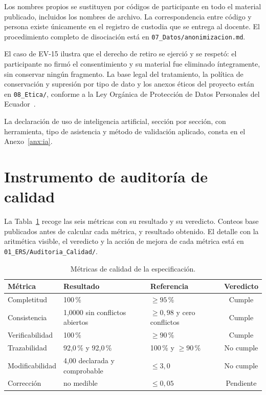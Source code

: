 \documentclass[11pt,a4paper]{article}
\begin{document}
Los nombres propios se sustituyen por c\'odigos de participante en todo el material
publicado, incluidos los nombres de archivo. La correspondencia entre c\'odigo y persona
existe \'unicamente en el registro de custodia que se entrega al docente. El
procedimiento completo de disociaci\'on est\'a en \texttt{07\_Datos/anonimizacion.md}.

El caso de EV-15 ilustra que el derecho de retiro se ejerci\'o y se respet\'o: el
participante no firm\'o el consentimiento y su material fue eliminado \'integramente, sin
conservar ning\'un fragmento. La base legal del tratamiento, la pol\'itica de
conservaci\'on y supresi\'on por tipo de dato y los anexos \'eticos del proyecto est\'an
en \texttt{08\_Etica/}, conforme a la Ley Org\'anica de Protecci\'on de Datos Personales
del Ecuador~\cite{asamblea2021lopdp}.

La declaraci\'on de uso de inteligencia artificial, secci\'on por secci\'on, con
herramienta, tipo de asistencia y m\'etodo de validaci\'on aplicado, consta en el
Anexo~\ref{anx:ia}.

\newpage

\nocite{*}


\newpage
\appendix

\section{Instrumento de auditor\'ia de calidad}
\label{anx:auditoria}

La Tabla~\ref{tab:metricas} recoge las seis m\'etricas con su resultado y su veredicto. Conteos base publicados antes de calcular cada m\'etrica, y resultado obtenido. El
detalle con la aritm\'etica visible, el veredicto y la acci\'on de mejora de cada
m\'etrica est\'a en \texttt{01\_ERS/Auditoria\_Calidad/}.

\begin{table}[H]\centering\small
\caption{M\'etricas de calidad de la especificaci\'on.}
\label{tab:metricas}
\begin{tabular}{lllc}
\toprule
\textbf{M\'etrica} & \textbf{Resultado} & \textbf{Referencia} & \textbf{Veredicto} \\
\midrule
Completitud      & 100\,\% & $\geq 95$\,\%            & Cumple \\
Consistencia     & 1,0000 sin conflictos abiertos & $\geq 0{,}98$ y cero conflictos & Cumple \\
Verificabilidad  & 100\,\% & $\geq 90$\,\%            & Cumple \\
Trazabilidad     & 92,0\,\% y 92,0\,\% & 100\,\% y $\geq 90$\,\% & No cumple \\
Modificabilidad  & 4,00 declarada y comprobable & $\leq 3{,}0$ & No cumple \\
Correcci\'on     & no medible & $\leq 0{,}05$          & Pendiente \\
\bottomrule
\end{tabular}
\end{table}
\end{document}
